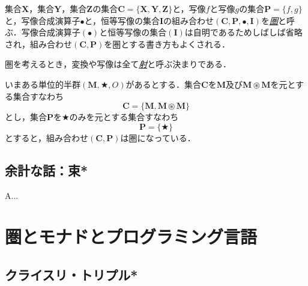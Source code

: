 \documentclass[a4paper,draft]{jsbook}
\newcommand{\keyword}[1]{{\underline{\emph{#1}}}}
\newcommand{\mathSet}[1]{\mathbf{#1}} %
\newcommand{\mathAnyBinaryOperator}{\mathbin{\bigstar}}
\newcommand{\mathCompose}{\mathbin{\bullet}}
\newcommand{\mathSetTimes}{\mathbin{\circledast}}
\newcommand{\mathCategoryShort}[2]{(#1,#2)}
\newcommand{\mathMonoid}[3]{(#1,#2,#3)}
\newcommand{\mathCategory}[4]{(#1,#2,#3,#4)}
\begin{document}
集合$\mathSet{X}$，集合$\mathSet{Y}$，集合$\mathSet{Z}$の集合$\mathSet{C}=\{\mathSet{X},\mathSet{Y},\mathSet{Z}\}$と，写像$f$と写像$g$の集合$\mathSet{P}=\{f,g\}$と，写像合成演算子$\mathCompose$と，恒等写像の集合$\mathSet{I}$の組み合わせ$\mathCategory{\mathSet{C}}{\mathSet{P}}{\mathCompose}{\mathSet{I}}$を\keyword{圏}と呼ぶ．写像合成演算子$(\mathCompose)$と恒等写像の集合$(\mathSet{I})$は自明であるためしばしば省略され，組み合わせ$\mathCategoryShort{\mathSet{C}}{\mathSet{P}}$を圏とする書き方もよくされる．

圏を考えるとき，変換や写像は全て\keyword{射}と呼ぶ決まりである．

いまある単位的半群$\mathMonoid{\mathSet{M}}{\mathAnyBinaryOperator}{O}$があるとする．集合$\mathSet{C}$を$\mathSet{M}$及び$\mathSet{M}\mathSetTimes\mathSet{M}$を元とする集合すなわち
\begin{equation}
\mathSet{C}=\{\mathSet{M},\mathSet{M}\mathSetTimes\mathSet{M}\}
\end{equation}
とし，集合$\mathSet{P}$を$\mathAnyBinaryOperator$のみを元とする集合すなわち
\begin{equation}
\mathSet{P}=\{\mathAnyBinaryOperator\}
\end{equation}
とすると，組み合わせ$\mathCategoryShort{\mathSet{C}}{\mathSet{P}}$は圏になっている．

\section{余計な話：束*}

A...


\chapter{圏とモナドとプログラミング言語}


\section{クライスリ・トリプル*}
\end{document}
